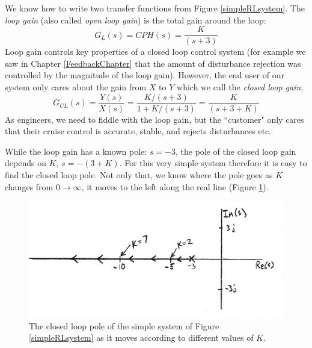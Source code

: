 We know how to write two transfer functions from Figure \ref{simpleRLsystem}.   The {\it loop gain} (also called {\it open loop gain}) is the total gain around the loop:
\[
G_L(s) = CPH(s) = \frac{K}{(s+3)}
\]
Loop gain controls key properties of a closed loop control system (for example we saw in Chapter \ref{FeedbackChapter}
that the amount of disturbance rejection was controlled by the magnitude of the loop gain).
However, the end user of our system only cares about the gain from $X$ to $Y$ which we  call
the {\it closed loop gain},
\[
G_{CL}(s) = \frac{Y(s)}{X(s)} = \frac {K/(s+3)} {1+K/(s+3)} = \frac {K} {(s+3+K)}
\]
As engineers, we need to fiddle with the loop gain, but the ``customer" only cares that their cruise control is accurate, stable, and rejects disturbances etc.

While the loop gain has a known pole: $s=-3$, the pole of the closed loop gain depends on $K$, $s=-(3+K)$.   For this very simple system therefore it is easy to find the closed loop pole.   Not only that, we know where the pole goes as $K$ changes from $0\to\infty$, it moves to the left along the real line (Figure \ref{movingsimplepole}).

\begin{figure}\centering
\includegraphics[width=120mm]{figs07/00971.png}
\caption{The closed loop pole of the simple system of Figure \ref{simpleRLsystem} as it moves according to different values of $K$.}\label{movingsimplepole}
\end{figure}




